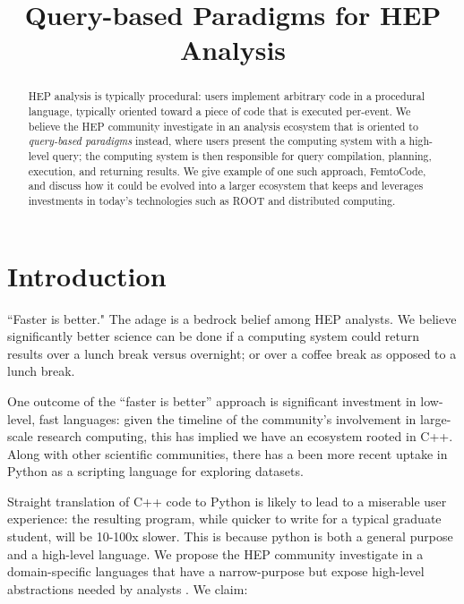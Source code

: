 \documentclass{article}
\begin{document}
\title{Query-based Paradigms for HEP Analysis}

\maketitle

\begin{abstract}
HEP analysis is typically procedural: users implement arbitrary code in a procedural language, typically oriented toward a piece of code that is executed per-event.  We believe the HEP community investigate in an analysis ecosystem that is oriented to \textit{query-based paradigms} instead, where users present the computing system with a high-level query; the computing system is then responsible for query compilation, planning, execution, and returning results.  We give example of one such approach, FemtoCode, and discuss how it could be evolved into a larger ecosystem that keeps and leverages investments in today's technologies such as ROOT and distributed computing.
\end{abstract}

\section{Introduction}

``Faster is better."  The adage is a bedrock belief among HEP analysts.  We believe significantly better science can be done if a computing system could return results over a lunch break versus overnight; or over a coffee break as opposed to a lunch break.

One outcome of the ``faster is better'' approach is significant investment in low-level, fast languages: given the timeline of the community's involvement in large-scale research computing, this has implied we have an ecosystem rooted in C++.  Along with other scientific communities, there has a been more recent uptake in Python as a scripting language for exploring datasets.

Straight translation of C++ code to Python is likely to lead to a miserable user experience: the resulting program, while quicker to write for a typical graduate student, will be 10-100x slower.  This is because python is both a general purpose and a high-level language.  We propose the HEP community investigate in a domain-specific languages that have a narrow-purpose but expose high-level abstractions needed by analysts \footnotemark.  We claim:

\end{document}
